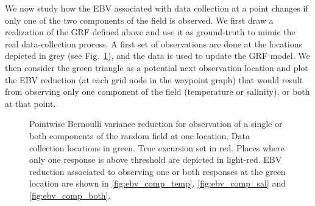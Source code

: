 \documentclass[aoas]{imsart}
\begin{document}
We now study how the EBV associated with data
collection at a point changes if only one of the two components of the
field is observed. We first draw a realization of the GRF defined
above and use it as ground-truth to mimic the real data-collection
process. A first set of observations are done at the locations
depicted in grey (see Fig.~\ref{fig:ebv_comp}), and the data is used
to update the GRF model. We then consider the green triangle as a
potential next observation location and plot the EBV reduction (at
each grid node in the waypoint graph) that would result from observing
only one component of the field (temperature or salinity), or both at
that point.

\begin{figure}[!b] 
\centering 
{}
\caption{Pointwise Bernoulli variance reduction for observation of a
  single or both components of the random field at one location. Data
  collection locations in green. True excursion set in red. Places
  where only one response is above threshold are depicted in light-red. EBV
  reduction associated to observing one or both responses at the green
  location are shown in \ref{fig:ebv_comp_temp},
  \ref{fig:ebv_comp_sal} and \ref{fig:ebv_comp_both}.}
\label{fig:ebv_comp}
\end{figure}
\end{document}
